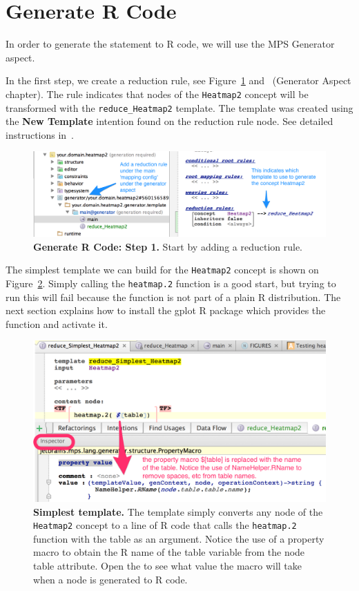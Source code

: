 \section{Generate R Code}
In order to generate the statement to R code, we will use the MPS Generator aspect. 

In the first step, we create a reduction rule, see Figure~\ref{fig:GeneratorHowToStep1} and~\cite{campagne2014mps} (Generator Aspect chapter). The rule indicates that nodes of the \texttt{Heatmap2} concept will be transformed with the \texttt{reduce\_Heatmap2} template. The template was created using the \textbf{New Template} intention found on the reduction rule node. See detailed instructions in~\cite{campagne2014mps}.

\begin{figure}[h!tbp]
  \centering
  \includegraphics[width=\figWidthWide]{figures/GeneratorHowToStep1.png}
\caption[Generate R Code: Step 1.]{\textbf{Generate R Code: Step 1.} Start by adding a reduction rule.}
\label{fig:GeneratorHowToStep1}
\end{figure}

The simplest template we can build for the \texttt{Heatmap2} concept is shown on Figure~\ref{fig:SimplestTemplate}. Simply calling the \texttt{heatmap.2} function is a good start, but trying to run this will fail because the function is not part of a plain R distribution. The next section explains how to install the gplot R package which provides the function and activate it. 

\begin{figure}[h!tbp]
  \centering
  \includegraphics[width=\figWidthWide]{figures/SimplestTemplate.png}
\caption[Simplest template.]{\textbf{Simplest template.} The template simply converts any node of the \texttt{Heatmap2} concept to a line of R code that calls the \texttt{heatmap.2} function with the table as an argument. Notice the use of a property macro to obtain the R name of the table variable from the node table attribute. Open the \inspectorTabIcon{} to see what value the macro will take when a node is generated to R code.}
\label{fig:SimplestTemplate}
\end{figure}

